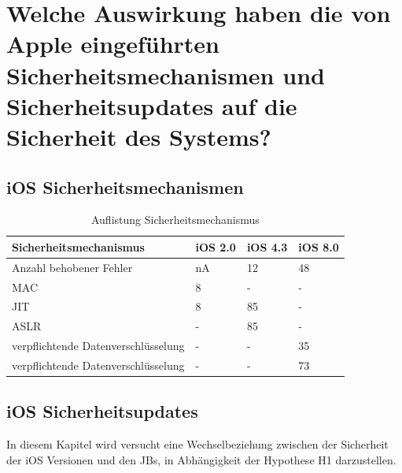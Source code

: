 \newpage
\section{Welche Auswirkung haben die von Apple eingeführten Sicherheitsmechanismen und Sicherheitsupdates auf die Sicherheit des Systems?}
\label{sec:Frage2}
\subsection{iOS Sicherheitsmechanismen}
\label{sec:Frage2SecMechanismen}
 
\begin{table}[htp!]
    \begin{center}
        \begin{tabular}{|l|l|l|l|} \hline
            \textbf{Sicherheitsmechanismus} & \textbf{iOS 2.0} & \textbf{iOS 4.3} & \textbf{iOS 8.0} \\ \hline
             Anzahl behobener Fehler & nA & 12 & 48\\ \hline
             MAC & 8 & - & - \\ \hline
             JIT & 8 & 85 & - \\ \hline
             ASLR & - & 85 & - \\ \hline
             verpflichtende Datenverschlüsselung & - & - & 35 \\ \hline
             verpflichtende Datenverschlüsselung & - & - & 73\\ \hline
        \end{tabular} 
        \caption{Auflistung Sicherheitsmechanismus}
        \label{tab:SecMechanismBugs}
    \end{center}
\end{table}

\subsection{iOS Sicherheitsupdates}
\label{sec:Frage2SecUpdate}

In diesem Kapitel wird versucht eine Wechselbeziehung zwischen der Sicherheit der iOS Versionen und den JBs, in Abhängigkeit der Hypothese H1 darzustellen. 
 
